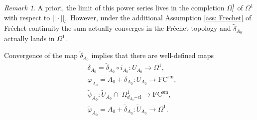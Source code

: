 \documentclass[11pt,a4paper]{amsart}
\theoremstyle{plain} %
\theoremstyle{definition}
\theoremstyle{remark}
\newtheorem{rem}[thm]{Remark}
\newcommand{\mr}{\mathrm}
\newcommand{\sfa}{\mathsf{a}}
\newcommand{\til}{\widetilde}
\newcommand{\FC}{\mathrm{FC}}
\begin{document}
\begin{rem} \label{rem: frechet convergence}A priori, the limit of this power series lives in the completion $\Omega^{1}_l$ of $\Omega^1$ with respect to $||\cdot||_l$. 
However, under the additional Assumption \ref{ass: Frechet} of Fr\'echet continuity the sum actually converges in the Fr\'echet topology and $\til{\delta}_{A_0}$ actually lands in $\Omega^1$. 
\end{rem}

Convergence of the map $\til{\delta}_{A_0}$ implies that there are well-defined maps
\begin{align}
&\delta_{A_0} = \til{\delta}_{A_0} \circ i_{A_0} \colon U_{A_0} \to \Omega^1,\\ 
&\varphi_{A_0} = A_0 + \delta_{A_0} \colon U_{A_0} \to \FC^\mr{sm}, \\ 
& \til{\psi}_{A_0}  \colon \til{U}_{A_0} \cap\; \Omega^1_{d_{A_0}\mr{-cl}} \to \FC^\mr{sm}, \\
&\til{\varphi}_{A_0} = A_0 + \til{\delta}_{A_0} \colon \til{U}_{A_0} \to \Omega^1.
\end{align}
\end{document}
